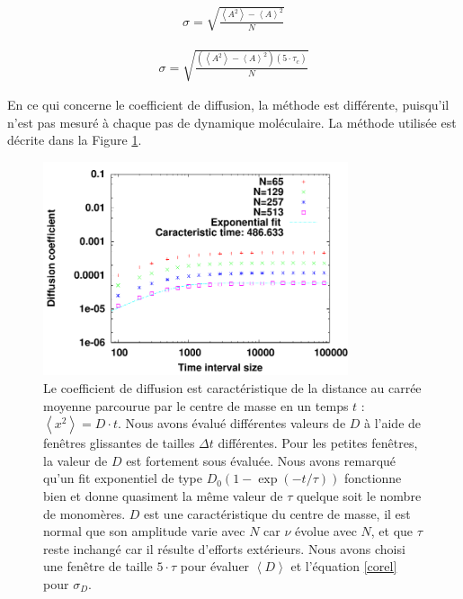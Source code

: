 \documentclass[a4paper,11pt]{article}
\begin{document}
\begin{eqnarray}
\sigma=\sqrt{\frac{\left<A^2\right>-\left<A\right>^2}{N}}
\label{corel}
\end{eqnarray}

\begin{eqnarray}
\sigma=\sqrt{\frac{\left(\left<A^2 \right>-\left<A \right>^2\right)\left(5 \cdot \tau_c\right)}{N}}
\label{corel2}
\end{eqnarray}

En ce qui concerne le coefficient de diffusion, la méthode est différente, puisqu'il n'est pas mesuré à chaque pas de dynamique moléculaire. La méthode utilisée est décrite dans la Figure \ref{errorbard}.

\begin{figure}[H]
\begin{center}
\includegraphics[width=0.8\textwidth]{dexptime.pdf}

\caption{Le coefficient de diffusion est caractéristique de la distance au carrée moyenne parcourue par le centre de masse en un temps $t$ : $\left<x^2\right> =D\cdot t$. Nous avons évalué différentes valeurs de $D$ à l'aide de fenêtres glissantes de tailles $\Delta t$ différentes. Pour les petites fenêtres, la valeur de $D$ est fortement sous évaluée. Nous avons remarqué qu'un fit exponentiel de type $D_0\left(1-\exp\left(-t/\tau\right)\right)$ fonctionne bien et donne quasiment la même valeur de $\tau$ quelque soit le nombre de monomères. $D$ est une caractéristique du centre de masse, il est normal que son amplitude varie avec $N$ car $\nu$ évolue avec $N$, et que $\tau$ reste inchangé car il résulte d’efforts extérieurs. Nous avons choisi une fenêtre de taille $5\cdot \tau$ pour évaluer $\left<D\right> $ et l'équation \ref{corel} pour $\sigma_D$.}
\label{errorbard}
\end{center}
\end{figure}
\end{document}
